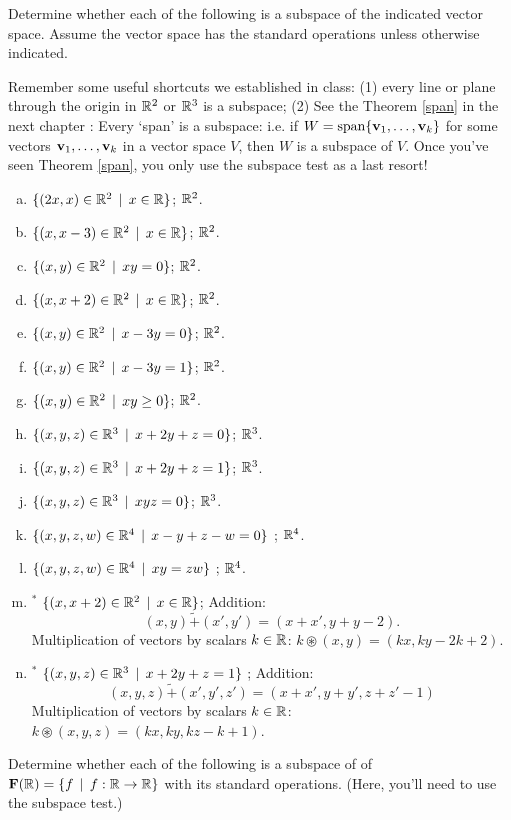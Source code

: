 
  
 \begin{prob} \label{prob05.1} Determine whether each of the following is a subspace of the indicated vector space. Assume the vector space has the standard operations unless otherwise indicated. 

Remember some useful shortcuts we established in class: (1) every line or plane through the origin in $\mathbb{R}^2$ or $\mathbb{R}^3$ is a subspace; (2) See the Theorem \ref{span} in the next chapter : Every `span' is a subspace: i.e. if $W=\textrm{span}\{\mathbf{v}_1, \dots, \mathbf{v}_k\}$ for some vectors $\mathbf{v}_1, \dots, \mathbf{v}_k $ in a vector space $V$, then $W$ is a subspace of $V$. Once you've seen Theorem \ref{span}, you only use the subspace test as a last resort!
\medskip
\begin{enumerate}[a)]
\item  $\{(2x, x) \in \mathbb{R}^2\,\mid \, x\in \mathbb{R} \}$; $\mathbb{R}^2$.\medskip
\item\sov $\{(x, x-3) \in \mathbb{R}^2\,\mid \, x\in \mathbb{R} \}$; $\mathbb{R}^2$.
\medskip
\item $\{(x, y) \in \mathbb{R}^2\,\mid \, xy=0 \}$; $\mathbb{R}^2$.
\medskip
 
\item  $\{(x, x+2) \in \mathbb{R}^2\,\mid \, x\in \mathbb{R} \}$;  $\mathbb{R}^2$. \medskip

\item\sov  $\{(x, y) \in \mathbb{R}^2\,\mid \, x -3y=0  \}$;   $\mathbb{R}^2$. \medskip
%

\item $\{(x, y) \in \mathbb{R}^2\,\mid \, x -3y=1  \}$;    $\mathbb{R}^2$.\medskip
%

\item\sov  $\{(x, y) \in \mathbb{R}^2\,\mid \, xy \ge 0  \}$;     $\mathbb{R}^2$.\medskip
%
 
\item  $\{(x, y, z) \in \mathbb{R}^3\,\mid \, x+2y+z=0  \}$;    $\mathbb{R}^3$.\medskip \medskip
%
\item\sov  $\{(x, y, z) \in \mathbb{R}^3\,\mid \, x+2y+z=1  \}$;    $\mathbb{R}^3$.\medskip 
%
\item $\{(x, y,z) \in \mathbb{R}^3\,\mid \, xyz=0 \}$; $\mathbb{R}^3$.
\medskip

\item\sov  $\{(x, y, z, w) \in \mathbb{R}^4\,\mid \, x-y+z-w=0  \}$ ; $\mathbb{R}^4$.  \medskip
%
\item  $\{(x, y, z, w) \in \mathbb{R}^4\,\mid \, xy=zw  \}$ ; $\mathbb{R}^4$.  \medskip
%
\item$^\ast$  $\{(x, x+2) \in \mathbb{R}^2\,\mid \, x\in \mathbb{R} \}$;  
Addition: $$(x,y) \tilde+ (x',y')=(x+x', y+y -2).$$ Multiplication of vectors  by  scalars $k\in \mathbb{R}$: $k\circledast (x,y)=(kx, ky-2k+2)$.     \medskip
%
\item$^\ast$  $\{(x, y, z) \in \mathbb{R}^3\,\mid \, x+2y+z=1  \}$ ;  Addition: $$(x,y,z) \tilde+ (x',y',z')=(x+x', y+y',z+z'-1)$$ Multiplication of vectors  by  scalars $k\in \mathbb{R}$: $k\circledast (x,y,z)=(kx, ky, kz-k+1)$. \medskip 
%
\end{enumerate}
\end{prob} \begin{prob} \label{prob05.2}   Determine whether each of the following is a subspace of of $\mathbf{F}(\mathbb{R})=\{f \,\mid \, f: \mathbb{R} \to \mathbb{R} \}$ with its standard operations. (Here, you'll need to use the subspace test.)  
 

\end{prob}
